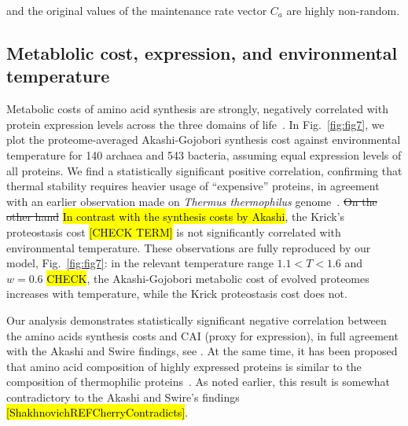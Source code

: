 \documentclass[10pt,letterpaper]{article}
\begin{document}
and the original values of the maintenance rate vector $C_{a}$ are highly non-random.

\subsection{Metablolic cost, expression, and environmental temperature}

Metabolic costs of amino acid synthesis are strongly, negatively correlated with protein expression levels across the three domains of life~\cite{Akashi2002Metabolic,Swire2007Selection}.  In Fig.~\ref{fig:fig7}, we plot the proteome-averaged Akashi-Gojobori synthesis cost against environmental temperature for 140 archaea and 543 bacteria, assuming equal expression levels of all proteins. We find a statistically significant positive correlation, confirming that thermal stability requires heavier usage of ``expensive'' proteins, in agreement with an earlier observation made on {\it Thermus thermophilus} genome~\cite{Swire2007Selection}. \st{On the other hand} \hl{In contrast with the synthesis costs by Akashi}, the Krick's proteostasis cost \hl{[CHECK TERM]} is not significantly correlated with environmental temperature. These observations are fully reproduced by our model, Fig.~\ref{fig:fig7}: in the relevant temperature range $1.1 < T < 1.6$ and $w=0.6$ \hl{CHECK}, the Akashi-Gojobori metabolic cost of evolved proteomes increases with temperature, while the Krick proteostasis cost does not.

Our analysis demonstrates statistically significant negative correlation between the amino acids synthesis costs and CAI (proxy for expression), in full agreement with the Akashi and Swire findings, see . At the same time, it has been proposed that amino acid composition of highly expressed proteins is similar to the composition of thermophilic proteins~\cite{Cherry2010Highly}. As noted earlier, this result is somewhat contradictory to the Akashi and Swire's findings \hl{[ShakhnovichREFCherryContradicts]}. 

\end{document}

